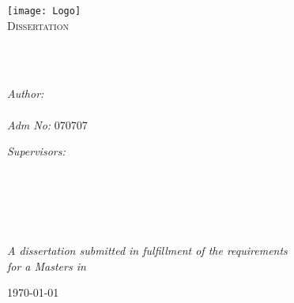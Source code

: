 \documentclass[
  11pt,
  oneside,
  english,
  doublespacing,
  headsepline,
]{MastersDoctoralThesis}
\author{\href{https://bonfacemunyoki.com}{Bonface Munyoki Kilyungi}}
\begin{document}
\frontmatter

\pagestyle{plain}

\begin{titlepage}
\begin{center}

\vspace*{.06\textheight}
\texttt{[image: Logo]}\\ %
\textsc{\Large Dissertation}\\[0.5cm] %

\HRule \\[0.4cm] %
{\huge \bfseries \ttitle\par}\vspace{0.4cm} %
\HRule \\[1.3cm] %

\begin{minipage}[t]{0.4\textwidth}
\begin{flushleft} \large
\emph{Author:}\\
\href{https://bonfacemunyoki.com}{\authorname} \\
\emph{Adm No:} 070707
\end{flushleft}
\end{minipage}
\begin{minipage}[t]{0.4\textwidth}
  \begin{flushright} \large
    \emph{Supervisors:} \\
    \supnamei\\
    \supnameii\\
    \supnameiii\\
    \supnameiv
\end{flushright}
\end{minipage}\\[1cm]

\vfill

\large \textit{A dissertation submitted in fulfillment of the
  requirements\\ for a Masters in \degreename}\\[0.3cm]

\vfill

{\large \today}\\[1cm] %


\end{center}

\end{titlepage}
\end{document}
